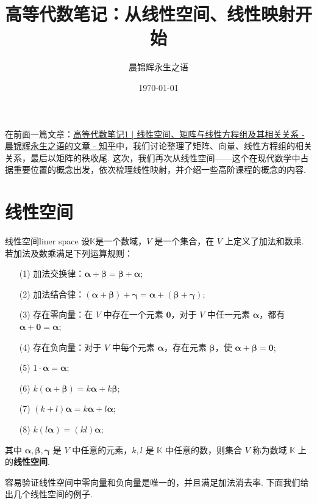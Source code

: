 \documentclass[12pt, a4paper,newtx]{ctexart}
\title{\textbf{高等代数笔记：从线性空间、线性映射开始}}
\author{晨锦辉永生之语}
\date{\today}
\begin{document}
\maketitle
\tableofcontents
\newpage
在前面一篇文章：\href{https://zhuanlan.zhihu.com/p/14017352624}{高等代数笔记1 | 线性空间、矩阵与线性方程组及其相关关系 - 晨锦辉永生之语的文章 - 知乎}中，我们讨论整理了矩阵、向量、线性方程组的相关关系，最后以矩阵的秩收尾. 这次，我们再次从线性空间——这个在现代数学中占据重要位置的概念出发，依次梳理线性映射，并介绍一些高阶课程的概念的内容. 
\section{线性空间}

\begin{definition}{线性空间}{liner space}\kaishu 
	设$ \mathbb{K} $是一个数域，$ V $ 是一个集合，在 $ V $ 上定义了加法和数乘. 若加法及数乘满足下列运算规则：
	\begin{enumerate}
		\item[(1)] 加法交换律：$ \bm\alpha + \bm\beta = \bm\beta + \bm\alpha $;
		\item[(2)] 加法结合律：$ (\bm\alpha + \bm\beta) + \bm\gamma = \bm\alpha + (\bm\beta + \bm\gamma) $;
		\item[(3)] 存在零向量：在 $ V $ 中存在一个元素 $ \bm 0 $，对于 $ V $ 中任一元素 $ \bm\alpha $，都有 $ \bm\alpha + \bm 0 = \bm\alpha $;
		\item[(4)] 存在负向量：对于 $ V $ 中每个元素 $ \bm\alpha $，存在元素 $ \bm\beta $，使 $ \bm\alpha + \bm\beta = \bm 0 $;
		\item[(5)] $ 1 \cdot \bm\alpha = \bm\alpha $;
		\item[(6)] $ k(\bm\alpha + \bm\beta) = k\bm\alpha + k\bm\beta $;
		\item[(7)] $ (k + l)\bm\alpha = k\bm\alpha + l\bm\alpha $;
		\item[(8)] $ k(l\bm\alpha) = (kl)\bm\alpha $;
	\end{enumerate}
	其中 $ \bm\alpha, \bm\beta, \bm\gamma $ 是 $ V $ 中任意的元素，$ k, l $ 是 $ \mathbb{K} $ 中任意的数，则集合 $ V $ 称为数域 $ \mathbb{K} $ 上的\textbf{线性空间}. 
\end{definition}
	容易验证线性空间中零向量和负向量是唯一的，并且满足加法消去率. 下面我们给出几个线性空间的例子. 
\end{document}
